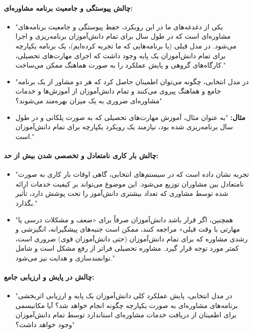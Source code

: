 \documentclass[12pt]{article}
\begin{document}
\paragraph{چالش پیوستگی و جامعیت برنامه مشاوره‌ای:}
\begin{itemize}
    \item "یکی از دغدغه‌های ما در این رویکرد، حفظ پیوستگی و جامعیت برنامه‌های مشاوره‌ای است که در طول سال برای تمام دانش‌آموزان برنامه‌ریزی و اجرا می‌شود. در مدل قبلی (یا برنامه‌هایی که ما تجربه کرده‌ایم)، یک برنامه یکپارچه برای تمام دانش‌آموزان یک پایه وجود داشت که اجرای مهارت‌های تحصیلی، کارگاه‌های گروهی و پایش عملکرد را به صورت هماهنگ ممکن می‌ساخت."
    \item "در مدل انتخابی، چگونه می‌توان اطمینان حاصل کرد که هر دو مشاور از یک برنامه جامع و هماهنگ پیروی می‌کنند و تمام دانش‌آموزان از آموزش‌ها و خدمات مشاوره‌ای ضروری به یک میزان بهره‌مند می‌شوند؟"
    \item \textbf{مثال:} "به عنوان مثال، آموزش مهارت‌های تحصیلی که به صورت پلکانی و در طول سال برنامه‌ریزی شده بود، نیازمند یک رویکرد یکپارچه برای تمام دانش‌آموزان است."
\end{itemize}

\paragraph{چالش بار کاری نامتعادل و تخصصی شدن بیش از حد:}
\begin{itemize}
    \item "تجربه نشان داده است که در سیستم‌های انتخابی، گاهی اوقات بار کاری به صورت نامتعادل بین مشاوران توزیع می‌شود. این موضوع می‌تواند بر کیفیت خدمات ارائه شده توسط مشاوری که تعداد بیشتری دانش‌آموز را تحت پوشش دارد، تأثیر بگذارد."
    \item "همچنین، اگر قرار باشد دانش‌آموزان صرفاً برای «ضعف و مشکلات درسی یا مهارتی با وقت قبلی» مراجعه کنند، ممکن است جنبه‌های پیشگیرانه، انگیزشی و رشدی مشاوره که برای تمام دانش‌آموزان (حتی دانش‌آموزان قوی) ضروری است، کمتر مورد توجه قرار گیرد. مشاوره تحصیلی فراتر از رفع مشکل است و شامل توانمندسازی و هدایت نیز می‌شود."
\end{itemize}

\paragraph{چالش در پایش و ارزیابی جامع:}
\begin{itemize}
    \item "در مدل انتخابی، پایش عملکرد کلی دانش‌آموزان یک پایه و ارزیابی اثربخشی برنامه‌های مشاوره‌ای به صورت یکپارچه چگونه انجام خواهد شد؟ آیا مکانیسمی برای اطمینان از دریافت خدمات مشاوره‌ای استاندارد توسط تمام دانش‌آموزان وجود خواهد داشت؟"
\end{itemize}
\end{document}
